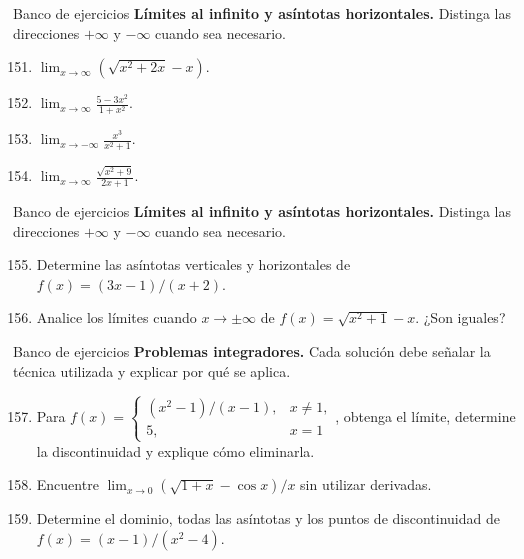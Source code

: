 \documentclass[12pt,aspectratio=169]{beamer}
\begin{document}
\begin{frame}[t,allowframebreaks]{Banco de ejercicios}
\small
\noindent \textbf{Límites al infinito y asíntotas horizontales.} Distinga las direcciones $+\infty$ y $-\infty$ cuando sea necesario.\par\smallskip
\begin{enumerate}\setcounter{enumi}{150}
\item $\displaystyle\lim_{x\to\infty}(\sqrt{x^2+2x}-x)$.
\item $\displaystyle\lim_{x\to\infty}\frac{5-3x^2}{1+x^2}$.
\item $\displaystyle\lim_{x\to-\infty}\frac{x^3}{x^2+1}$.
\item $\displaystyle\lim_{x\to\infty}\frac{\sqrt{x^2+9}}{2x+1}$.
\end{enumerate}
\end{frame}


\begin{frame}[t,allowframebreaks]{Banco de ejercicios}
\small
\noindent \textbf{Límites al infinito y asíntotas horizontales.} Distinga las direcciones $+\infty$ y $-\infty$ cuando sea necesario.\par\smallskip
\begin{enumerate}\setcounter{enumi}{154}
\item Determine las asíntotas verticales y horizontales de $f(x)=(3x-1)/(x+2)$.
\item Analice los límites cuando $x\to\pm\infty$ de $f(x)=\sqrt{x^2+1}-x$. ¿Son iguales?
\end{enumerate}
\end{frame}


\begin{frame}[t,allowframebreaks]{Banco de ejercicios}
\small
\noindent \textbf{Problemas integradores.} Cada solución debe señalar la técnica utilizada y explicar por qué se aplica.\par\smallskip
\begin{enumerate}\setcounter{enumi}{156}
\item Para $f(x)=\begin{cases}(x^2-1)/(x-1),&x\ne1,\\5,&x=1\end{cases}$, obtenga el límite, determine la discontinuidad y explique cómo eliminarla.
\item Encuentre $\lim_{x\to0}(\sqrt{1+x}-\cos x)/x$ sin utilizar derivadas.
\item Determine el dominio, todas las asíntotas y los puntos de discontinuidad de $f(x)=(x-1)/(x^2-4)$.
\end{enumerate}
\end{frame}
\end{document}
